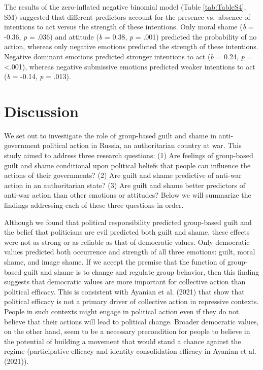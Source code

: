 \documentclass[
]{article}
\begin{document}
The results of the zero-inflated negative binomial model (Table \ref{tab:TableS4}, SM) suggested that different predictors account for the presence vs.~absence of intentions to act versus the strength of these intentions. Only moral shame (\emph{b} = -0.36, \emph{p} = .036) and attitude (\emph{b} = 0.38, \emph{p} = .001) predicted the probability of no action, whereas only negative emotions predicted the strength of these intentions. Negative dominant emotions predicted stronger intentions to act (\emph{b} = 0.24, \emph{p} = \textless.001), whereas negative submissive emotions predicted weaker intentions to act (\emph{b} = -0.14, \emph{p} = .013).

\allsectionsfont{\centering}

\hypertarget{discussion}{%
\section*{Discussion}\label{discussion}}

We set out to investigate the role of group-based guilt and shame in anti-government political action in Russia, an authoritarian country at war. This study aimed to address three research questions: (1) Are feelings of group-based guilt and shame conditional upon political beliefs that people can influence the actions of their governments? (2) Are guilt and shame predictive of anti-war action in an authoritarian state? (3) Are guilt and shame better predictors of anti-war action than other emotions or attitudes? Below we will summarize the findings addressing each of these three questions in order.

Although we found that political responsibility predicted group-based guilt and the belief that politicians are evil predicted both guilt and shame, these effects were not as strong or as reliable as that of democratic values. Only democratic values predicted both occurrence and strength of all three emotions: guilt, moral shame, and image shame. If we accept the premise that the function of group-based guilt and shame is to change and regulate group behavior, then this finding suggests that democratic values are more important for collective action than political efficacy. This is consistent with Ayanian et al. (2021) that show that political efficacy is not a primary driver of collective action in repressive contexts. People in such contexts might engage in political action even if they do not believe that their actions will lead to political change. Broader democratic values, on the other hand, seem to be a necessary precondition for people to believe in the potential of building a movement that would stand a chance against the regime (participative efficacy and identity consolidation efficacy in Ayanian et al. (2021)).
\end{document}
